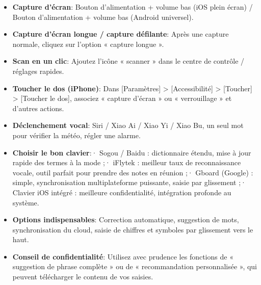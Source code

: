 
\begin{itemize}
  \item \textbf{Capture d'écran}: Bouton d'alimentation + volume bas (iOS plein écran) / Bouton d'alimentation + volume bas (Android universel).
  \item \textbf{Capture d'écran longue / capture défilante}: Après une capture normale, cliquez sur l'option « capture longue ».
  \item \textbf{Scan en un clic}: Ajoutez l'icône « scanner » dans le centre de contrôle / réglages rapides.
  \item \textbf{Toucher le dos (iPhone)}: Dans [Paramètres] > [Accessibilité] > [Toucher] > [Toucher le dos], associez « capture d'écran » ou « verrouillage » et d'autres actions.
  \item \textbf{Déclenchement vocal}: Siri / Xiao Ai / Xiao Yi / Xiao Bu, un seul mot pour vérifier la météo, régler une alarme.
\end{itemize}


\begin{itemize}
  \item \textbf{Choisir le bon clavier}:\newline · Sogou / Baidu : dictionnaire étendu, mise à jour rapide des termes à la mode ;\newline · iFlytek : meilleur taux de reconnaissance vocale, outil parfait pour prendre des notes en réunion ;\newline · Gboard (Google) : simple, synchronisation multiplateforme puissante, saisie par glissement ;\newline · Clavier iOS intégré : meilleure confidentialité, intégration profonde au système.
  \item \textbf{Options indispensables}: Correction automatique, suggestion de mots, synchronisation du cloud, saisie de chiffres et symboles par glissement vers le haut.
  \item \textbf{Conseil de confidentialité}: Utilisez avec prudence les fonctions de « suggestion de phrase complète » ou de « recommandation personnalisée », qui peuvent télécharger le contenu de vos saisies.
\end{itemize}


